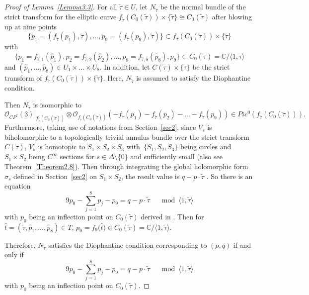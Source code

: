 \documentclass[10pt,a4paper]{amsart}
\numberwithin{equation}{section}
\def\operatorname#1{#1}
\begin{document}
\begin{proof}[Proof of Lemma~\ref{Lemma3.3}]
For all $\widetilde{\tau} \in U$, let $N_{\widetilde{\tau}}$ be the normal bundle of the strict transform for the elliptic curve $f_{\widetilde{\tau}}(C_0(\widetilde{\tau}))\times \{ \widetilde{\tau} \} \cong C_0(\widetilde{\tau})$ after blowing up at nine points
\[\{ \widetilde{p}_1=(f_{\widetilde{\tau}}(p_1),\widetilde{\tau}),\dots , \widetilde{p}_9=(f_{\widetilde{\tau}}(p_9),\widetilde{\tau}) \}\subset f_{\widetilde{\tau}}(C_0(\widetilde{\tau}))\times \{ \widetilde{\tau} \}\]
with
\[ \{ p_1=f_{\widetilde{\tau},1}(\hat{p}_1), p_2=f_{\widetilde{\tau},2}(\hat{p}_2),\dots ,p_8=f_{\widetilde{\tau},8}(\hat{p}_8),p_9 \}\subset C_0(\widetilde{\tau})=\mathbb{C}/ \langle 1,\widetilde{\tau} \rangle\]
and $(\hat{p}_1,\dots ,\hat{p}_8)\in $$U_1 \times \dots \times U_8$. In addition, let $C(\widetilde{\tau})\times \{ \widetilde{\tau} \}$ be the strict transform of $ f_{\widetilde{\tau}}(C_0(\widetilde{\tau}))\times \{ \widetilde{\tau} \}$. Here, $N_{\widetilde{\tau}}$ is assumed to satisfy the Diophantine condition.

Then $N_{\widetilde{\tau}}$ is isomorphic to
\[
\mathcal{O}_{\operatorname{CP}^2}(3)|_{f_{\widetilde{\tau}}(C_0(\widetilde{\tau}))}\otimes \mathcal{O}_{f_{\widetilde{\tau}}(C_0(\widetilde{\tau}))}(-f_{\widetilde{\tau}}(p_1)-f_{\widetilde{\tau}}(p_2)-\dots -f_{\widetilde{\tau}}(p_9))\in \operatorname{Pic}^0(f_{\widetilde{\tau}}(C_0(\widetilde{\tau}))).
\]
Furthermore, taking use of notations from Section~\ref{sec2}, since $V_s$ is biholomorphic to a topologically trivial annulus bundle over the strict transform $C(\widetilde{\tau})$, $V_s$ is homotopic to $ S_1 \times S_2 \times S_3$ with~$ { \{S_1 , S_2 , S_3 \}}$ being circles and $ S_1 \times S_2$ being $C^\infty$ sections for $s\in \Delta \setminus \{ 0\}$ and sufficiently small \cite{Takayuki-Takato2} (also see Theorem~\ref{Theorem2.8}). Then through integrating the global holomorphic form $\sigma_s$ defined in Section~\ref{sec2} on $ S_1 \times S_2$, the result value is $q-p \cdot \widetilde{\tau}$ \cite{Takayuki-Takato1}. So there is an equation
\[9p_0-\sum _{j=1}^8p_j-p_9=q-p\cdot \widetilde{\tau} \quad \mod \langle 1, \widetilde{\tau} \rangle \]
with $p_0$ being an inflection point on $C_0(\widetilde{\tau})$ derived in \cite{Takayuki-Takato2}. Then for $\hat{t}=(\widetilde{\tau},\hat{p}_1,\dots ,\hat{p}_8)\in T$, $p_9=f_9\bigl(\hat{t}\bigr)\in C_0(\widetilde{\tau})=\mathbb{C}/ \langle 1, \widetilde{\tau} \rangle$.

Therefore, $N_{\widetilde{\tau}}$ satisfies the Diophantine condition corresponding to $(p,q)$ if and only if
\[9p_0-\sum _{j=1}^8p_j-p_9=q-p\cdot \widetilde{\tau} \quad \mod \langle 1, \widetilde{\tau} \rangle \]
with $p_0$ being an inflection point on $C_0(\widetilde{\tau})$.


\end{proof}
\end{document}
